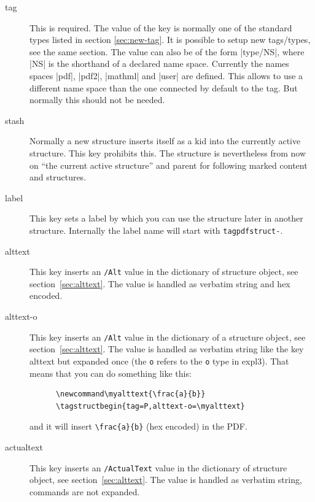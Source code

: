 \documentclass[DIV=12,parskip=half-,bibliography=totoc]{scrartcl}
\newcommand\PrintKeyName[1]{\textsf{#1}}
\newcommand\PDF{PDF}
\begin{document}
\begin{description}
  \item[\PrintKeyName{tag}]
   This is required. The value of the key is normally one of the standard types listed in section \ref{sec:new-tag}. It is possible to setup new tags/types, see the same section. The value can also be of the form |type/NS|, where |NS| is the
   shorthand of a declared name space. Currently the names spaces |pdf|, |pdf2|, |mathml| and |user| are defined. This allows to use a different name space than the one connected by default to the tag. But normally this should not be needed.

  \item[\PrintKeyName{stash}]
   Normally a new structure inserts itself as a kid into the currently active structure. This key prohibits this. The structure is nevertheless from now on \enquote{the current active structure} and parent for following  marked content and structures.

  \item[\PrintKeyName{label}]
   This key sets a label by which you can use the structure later in another structure. Internally the label name will start with \texttt{tagpdfstruct-}.


  \item[\PrintKeyName{alttext}]
   This key inserts an \texttt{/Alt} value in the dictionary of structure object, see section~\ref{sec:alttext}. The value is handled as verbatim string and hex encoded.

  \item[\PrintKeyName{alttext-o}]
   This key inserts an \texttt{/Alt} value in the dictionary of a structure object,  see section~\ref{sec:alttext}. The value is handled as verbatim string like the key \PrintKeyName{alttext} but expanded once (the \texttt{o} refers to the \texttt{o} type in expl3). That means that you can do something like this:


      \begin{lstlisting}
      \newcommand\myalttext{\frac{a}{b}}
      \tagstructbegin{tag=P,alttext-o=\myalttext}
      \end{lstlisting}



   and it will insert \verb+\frac{a}{b}+  (hex encoded) in the \PDF{}.


  \item[\PrintKeyName{actualtext}]
   This key inserts an \texttt{/ActualText} value in the dictionary of structure object,  see section~\ref{sec:alttext}. The value is handled as verbatim string, commands are not expanded.


\end{description}
\end{document}
